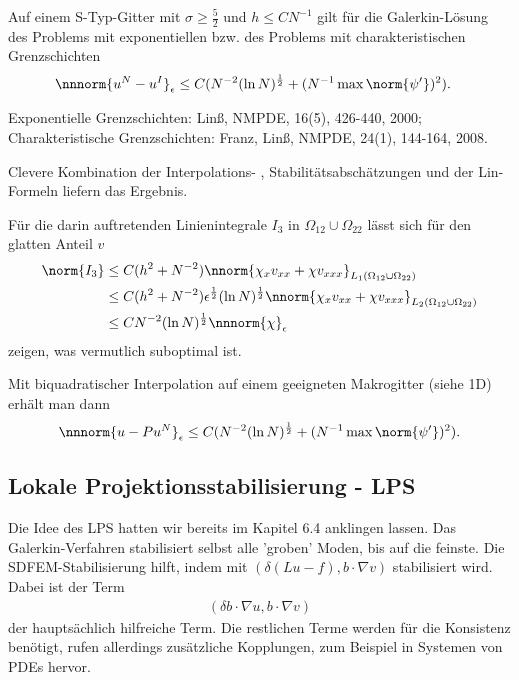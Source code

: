 \begin{satz}\label{thm:7-17}
  Auf einem S-Typ-Gitter mit $\sigma \geq \frac 52$ und $h \leq CN^{-1}$ gilt für die Galerkin-Lösung des Problems mit exponentiellen bzw. des Problems mit charakteristischen Grenzschichten
  \begin{align*}
    \nnnorm{u^{N} - u^{I}}_{\epsilon} &\leq C(N^{-2} (\ln N)^{\frac 12} + (N^{-1} \max \norm{\psi'})^{2}).  
  \end{align*}
\end{satz}
\begin{beweis}
Exponentielle Grenzschichten:  Linß, NMPDE, 16(5), 426-440, 2000;
Charakteristische Grenzschichten:  Franz, Linß, NMPDE, 24(1), 144-164, 2008. 

Clevere Kombination der Interpolations- , Stabilitätsabschätzungen und der Lin-Formeln liefern das Ergebnis. 

Für die darin auftretenden Linienintegrale $I_{3}$ in $\Omega_{12} \cup \Omega_{22}$ lässt sich für den glatten Anteil $v$
\begin{align*}
  \norm{I_{3}} & \leq C (h^{2} + N^{-2})\nnorm{\chi_{x}v_{xx} + \chi v_{xxx}}_{L_{1}(\Omega_{12} \cup \Omega_{22})}\\
  &\leq C (h^{2} + N^{-2})\epsilon^{\frac 12} (\ln N)^{\frac 12} \nnorm{\chi_{x}v_{xx} + \chi v_{xxx}}_{L_{2}(\Omega_{12} \cup \Omega_{22})}\\
  &\leq C  N^{-2} (\ln N)^{\frac 12} \nnnorm{\chi}_{\epsilon}
\end{align*}
zeigen, was vermutlich suboptimal ist. 
\end{beweis}
Mit biquadratischer Interpolation auf einem geeigneten Makrogitter (siehe 1D) erhält man dann
\begin{align*}
  \nnnorm{u - Pu^{N}}_{\epsilon} \leq C (N^{-2}(\ln N)^{\frac 12} + (N^{-1} \max \norm{\psi'})^{2}). 
\end{align*}

\subsection{Lokale Projektionsstabilisierung - LPS}
\label{sec:lokale-proj-lps}

Die Idee des LPS hatten wir bereits im Kapitel 6.4 anklingen lassen. Das Galerkin-Verfahren stabilisiert selbst alle 'groben' Moden, bis auf die feinste. Die SDFEM-Stabilisierung hilft, indem mit $(\delta(Lu - f), b \cdot \nabla v)$ stabilisiert wird. Dabei ist der Term
\begin{align*}
(  \delta b \cdot \nabla u, b \cdot\nabla v)
\end{align*}
der hauptsächlich hilfreiche Term. Die restlichen Terme werden für die Konsistenz benötigt, rufen allerdings zusätzliche Kopplungen, zum Beispiel in Systemen von PDEs hervor. 

